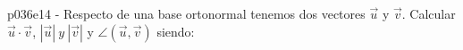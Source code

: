 \documentclass[spanish, 11pt]{exam}
\begin{document}
\begin{questions}
\begin{multicols}{2}
\begin{parts}
        \end{parts}
        \end{multicols}
        \question p036e14 - Respecto de una base ortonormal tenemos dos vectores $\overrightarrow{u}$ y $\overrightarrow{v}$.
Calcular $\overrightarrow{u}\cdot\overrightarrow{v}$, $|\overrightarrow{u}| \ y \ |\overrightarrow{v}|$ 
y $\angle(\overrightarrow{u},\overrightarrow{v})$ siendo:
        \begin{multicols}{2} 
        \end{multicols}
        
    \end{questions}
    
\end{document}
